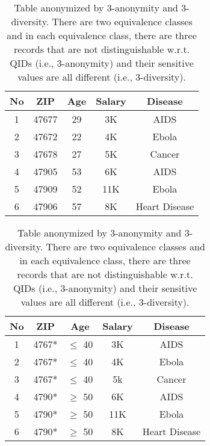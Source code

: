 \begin{table}[t]
\small
\caption{Original Table. ZIP and Age are QIDs; Salary and Disease are sensitive attributes.}
\label{T:mot_origintable}
\vspace{-1em}
\begin{center}
\begin{tabular}{| c | c | c | c | c | }
\hline
No  & ZIP & Age & Salary & Disease \\
\hline
1 & 47677 &  29 & 3K &  AIDS  \\ 
2 & 47672 &  22 & 4K &  Ebola \\ 
3 & 47678 &  27 & 5K &  Cancer  \\ 
4 & 47905 &  53 & 6K &  AIDS  \\ 
5 & 47909 &  52 & 11K &  Ebola  \\  
6 & 47906 &  57 & 8K &  Heart Disease  \\  
\hline
\end{tabular}
\end{center}
\caption{Table anonymized by 3-anonymity and 3-diversity. There are two equivalence classes and in each equivalence class, there are three records that are not distinguishable w.r.t. QIDs (i.e., 3-anonymity) and their sensitive values are all different (i.e., 3-diversity). \label{T:mot_anonymized}}
\vspace{-1em}
\begin{center}
\begin{tabular}{| c | c | c | c | c | }
\hline
No  & ZIP & Age & Salary & Disease \\
\hline
1 & 4767* &  $\leq$ 40 & 3K &  AIDS  \\ 
2 & 4767* &  $\leq$ 40 & 4K &  Ebola  \\ 
3 & 4767* &  $\leq$ 40 & 5k &  Cancer \\ \hline
4 & 4790* &  $\geq$ 50 & 6K &  AIDS  \\ 
5 & 4790* &  $\geq$ 50 & 11K &  Ebola  \\  
6 & 4790* &  $\geq$ 50 & 8K &  Heart Disease  \\ \hline
\end{tabular}
\end{center}
\end{table}

